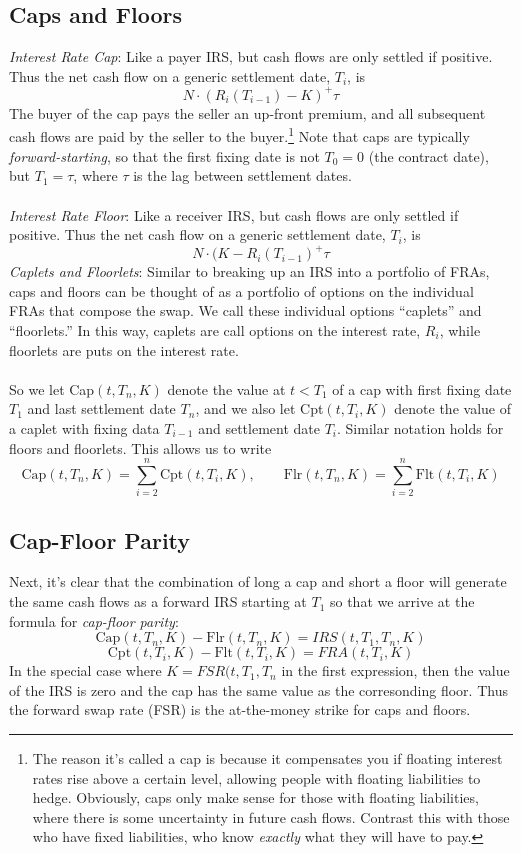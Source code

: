 \documentclass[a4paper,12pt]{scrartcl}
\begin{document}
\subsection{Caps and Floors}

{\sl Interest Rate Cap}: Like a payer IRS, but cash flows are only
settled if positive. Thus the net cash flow on a generic settlement
date, $T_i$, is
   \[ N\cdot (R_i(T_{i-1})-K)^+ \tau \]
The buyer of the cap pays the seller an up-front premium, and all 
subsequent cash flows are paid by the seller to the 
buyer.\footnote{The reason
it's called a cap is because it compensates you if floating interest 
rates rise above a certain level, allowing people with floating 
liabilities to hedge. Obviously, caps only make sense for 
those with floating liabilities, where there is some uncertainty
in future cash flows. Contrast this with those who have fixed 
liabilities, who know \emph{exactly} what they will have to pay.}
Note that caps are typically \emph{forward-starting}, so that the
first fixing date is not $T_0=0$ (the contract date), but 
$T_1=\tau$, where $\tau$ is the lag between settlement dates.
\\
\\
{\sl Interest Rate Floor}: Like a receiver IRS, but cash flows are only
settled if positive. Thus the net cash flow on a generic settlement
date, $T_i$, is
   \[ N\cdot (K - R_i(T_{i-1})^+ \tau \]
{\sl Caplets and Floorlets}: Similar to breaking up an IRS into a 
portfolio of FRAs, caps and floors can be thought of as a portfolio
of options on the individual FRAs that compose the swap. We call
these individual options ``caplets'' and ``floorlets.'' In this
way, caplets are call options on the interest rate, $R_i$, while
floorlets are puts on the interest rate.
\\
\\
So  we let Cap$(t,T_n,K)$ denote the value at $t< T_1$ of a cap
with first fixing date $T_1$ and last settlement date $T_n$,
and we also let Cpt$(t,T_i,K)$ denote the value of a caplet with
fixing data $T_{i-1}$ and settlement date $T_i$. Similar notation
holds for floors and floorlets. This allows us to write
   \[ \text{Cap}(t,T_n,K) = \sum^n_{i=2} \text{Cpt}(t,T_i,K), \qquad
      \text{Flr}(t,T_n,K) = \sum^n_{i=2} \text{Flt}(t,T_i,K)\]

\subsection{Cap-Floor Parity}

Next, it's clear that the combination of long a cap and short a floor
will generate the same cash flows as a forward IRS starting at $T_1$ 
so that we arrive at the formula for \emph{cap-floor parity}:
   \[ \text{Cap}(t,T_n,K) - \text{Flr}(t,T_n,K) = IRS(t,T_1,T_n, K) \]
   \[ \text{Cpt}(t,T_i,K) - \text{Flt}(t,T_i,K) = FRA(t,T_i,K) \]
In the special case where $K=FSR(t,T_1,T_n$ in the first expression,
then the value of the IRS is zero and the cap has the same value as
the corresonding floor. Thus the forward swap rate (FSR) 
is the at-the-money strike for caps and floors.
\end{document}
